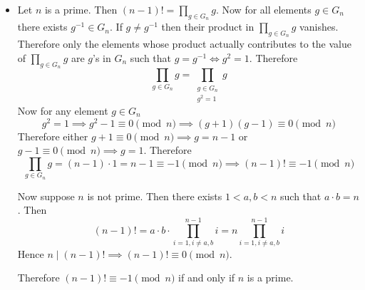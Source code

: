 \documentclass[a4paper, 11pt]{article}
\newcounter{problem}
\begin{document}
{\begin{itemize}
Therefore using the lemma we have $\det M=\prod\limits_{0<i<j<n} (j-i)$. Now we know $\det M\neq 0\pmod n$ if $n$ is prime. Therefore $M$ is invertible.

By the first part we know order of any element of $G_n$ divides the maximal order  of all elements. Now let $g$ be the element in $G_n$ which has the maximal order. Consider the vector $\hat{g}=\mat{1 & g & g^2 & \cdots & g^{n-2}}$.  Now $\hat{g}$ is a column of $M$. Since $M$ is invertible $1,g,\dots, g^{n-2}$ are linearly independent. Therefore order of $g$ is $n-1$. Hence $1,g,\dots, g^{n-2}$ are all elements of $G_n$. But $G_n$ has $n-1$ elements. Therefore $g$ is the generator of $G_n$. Hence $G_n$ is cyclic.
\item Let $n$ is a prime. Then $(n-1)!=\prod\limits_{g\in G_n} g$. Now for all elements $g\in G_n$ there exists $g^{-1}\in G_n$. If $g\neq g^{-1}$ then their product in $\prod\limits_{g\in G_n} g$ vanishes. Therefore only the elements whose product actually contributes to the value of $\prod\limits_{g\in G_n} g$ are $g$'s in $G_n$ such that $g=g^{-1}\iff g^2=1$.  Therefore $$\prod\limits_{g\in G_n} g=\prod\limits_{\substack{g\in G_n\\ g^2=1}} g$$Now for any element $g\in G_n$ $$g^2=1\implies g^2-1\equiv 0\pmod n\implies  (g+1)(g-1)\equiv 0\pmod n$$Therefore either $g+1\equiv 0\pmod n\implies g=n-1$ or $g-1\equiv 0 \pmod n\implies g=1$. Therefore $$\prod\limits_{g\in G_n} g=(n-1)\cdot 1=n-1\equiv -1\pmod n\implies (n-1)!\equiv -1\pmod n$$\parinn

Now suppose $n$ is not prime. Then there exists $1<a,b<n$ such that $a\cdot b=n$. Then $$(n-1)!=a\cdot b\cdot \prod_{i=1, i\neq a,b}^{n-1}i=n\prod_{i=1, i\neq a,b}^{n-1}i$$Hence $n\mid (n-1)!\implies (n-1)!\equiv 0\pmod n$.

Therefore $(n-1)!\equiv -1\pmod n$ if and only if $n$ is a prime.
\end{itemize}

}
%


\addtocounter{problem}{1}
%
%
%
%
\end{document}
